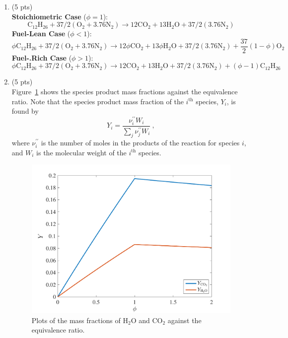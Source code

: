 \documentclass[12pt]{article}
\newcommand{\dod}{\mathrm{C}_{12}\mathrm{H}_{26}}
\newcommand{\nit}{\mathrm{N}_{2}}
\newcommand{\ox}{\mathrm{O}_{2}}
\newcommand{\wat}{\mathrm{H}_{2}\mathrm{O}}
\newcommand{\cardiox}{\mathrm{C}\mathrm{O}_{2}}
\begin{document}
	\begin{enumerate}[label=(\alph*)]
		\item (5 pts) \\
			\textbf{Stoichiometric Case} ($\phi = 1$): 
			\begin{equation}
				\boxed{\dod+37/2(\ox+3.76\nit)\rightarrow 12\cardiox+13\wat+37/2(3.76\nit)}
			\end{equation}
			\textbf{Fuel-Lean Case} ($\phi < 1$): 
			\begin{equation}
			\boxed{\phi\dod+37/2(\ox+3.76\nit)\rightarrow 12\phi\cardiox+13\phi\wat+37/2(3.76\nit)+\frac{37}{2}(1-\phi)\ox}
			\end{equation}
			\textbf{Fuel-.Rich Case} ($\phi > 1$): 
			\begin{equation}
			\boxed{\phi\dod+37/2(\ox+3.76\nit)\rightarrow 12\cardiox+13\wat+37/2(3.76\nit)+(\phi-1)\dod}
			\end{equation}
		\item (5 pts) \\
			Figure~\ref{FIG_1pt1b} shows the species product mass fractions against the equivalence ratio. Note that the species product mass fraction of the $i^{\mathrm{th}}$ species, $Y_i$, is found by
			\begin{equation}
				Y_i=\frac{\nu_i^{\prime\prime}W_i}{\sum_j \nu_j^{\prime\prime}W_i}\ ,
			\end{equation}
			where $\nu_i^{\prime\prime}$ is the number of moles in the products of the reaction for species $i$, and $W_i$ is the molecular weight of the $i^{\mathrm{th}}$ species.
			\begin{figure}[!t!]
				\begin{center}
					\includegraphics[width=120mm]{problem1pt1b.pdf}
					\caption{\label{FIG_1pt1b} Plots of the mass fractions of $\wat$ and $\cardiox$ against the equivalence ratio.}
				\end{center}
			\end{figure}
	\end{enumerate}
\end{document}
